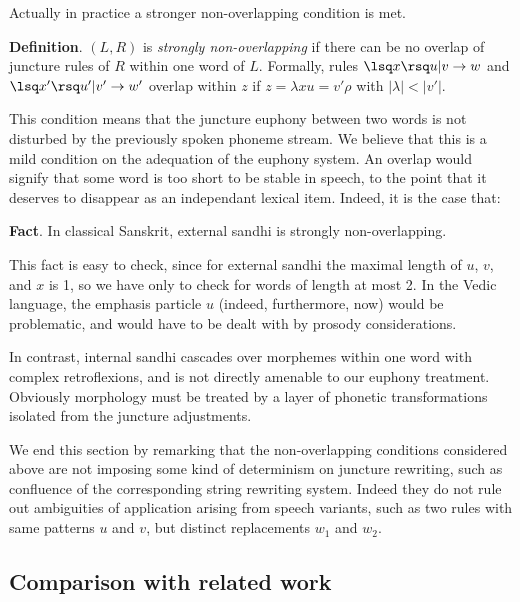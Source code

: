 Actually in practice a stronger non-overlapping condition is met.

\noindent
{\bf Definition}. 
$(L,R)$ is {\sl strongly non-overlapping} if there can be
no overlap of juncture rules of $R$ within one word of $L$. Formally,
rules $\lsq x\rsq u|v\rightarrow w$ and $\lsq x'\rsq u'|v'\rightarrow w'$
overlap within $z$ if $z=\lambda x u = v'\rho$ with
$\vert\lambda\vert<\vert v'\vert$.

This condition means that the juncture euphony between two words
is not disturbed by the previously spoken phoneme stream. 
We believe that
this is a mild condition on the adequation of the euphony system. An
overlap would signify that some word is too short to be stable in speech,
to the point that it deserves to disappear as an independant lexical item.
Indeed, it is the case that:

\noindent
{\bf Fact}. In classical Sanskrit, external sandhi is strongly non-overlapping.

This fact is easy to check, since for external sandhi the maximal length of
$u$, $v$, and $x$ is 1, so we have only to check for words of length at most 2.
In the Vedic language, the emphasis particle $u$ (indeed, furthermore, now) 
would be problematic, and would have to be dealt with by prosody 
considerations.

In contrast, internal sandhi cascades over morphemes within one word
with complex retroflexions, 
and is not directly amenable to our euphony treatment. Obviously 
morphology must be treated by a layer of phonetic transformations 
isolated from the juncture adjustments. 

We end this section by remarking that the non-overlapping conditions 
considered above are not imposing some kind of determinism on juncture
rewriting, such as confluence of the corresponding string rewriting system.
Indeed they do not rule out ambiguities of application arising from speech
variants, such as two rules with same patterns $u$ and $v$, but distinct
replacements $w_1$ and $w_2$. 


\subsection{Comparison with related work}

